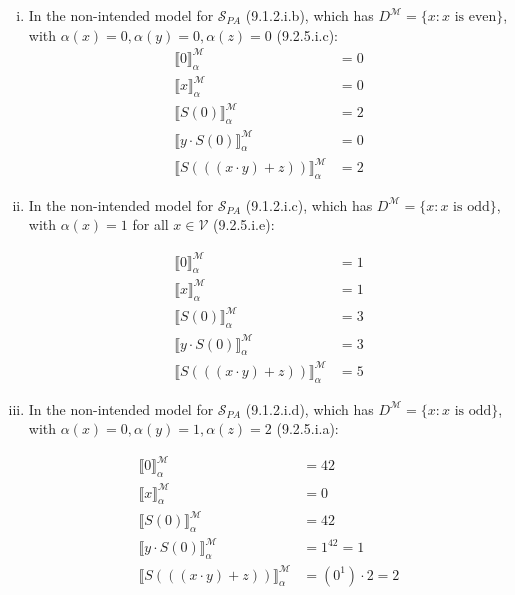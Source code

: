 \begin{enumerate}[\thesection.1]
\begin{enumerate}[(i)]
			\item In the non-intended model for $\mathcal{S}_{PA}$ (9.1.2.i.b), which has $D^\mathcal{M}=\{x:x\text{ is even}\}$, with $\alpha(x)=0,\alpha(y)=0,\alpha(z)=0$ (9.2.5.i.c):
			\begin{align*}
			\llbracket 0\rrbracket^\mathcal{M}_\alpha&=0\\
			\llbracket x\rrbracket^\mathcal{M}_\alpha&=0\\
			\llbracket S(0)\rrbracket^\mathcal{M}_\alpha&=2\\
			\llbracket y\cdot S(0)\rrbracket^\mathcal{M}_\alpha&=0\\
			\llbracket S(((x\cdot y)+z))\rrbracket^\mathcal{M}_\alpha&=2
			\end{align*}
			
			\item In the non-intended model for $\mathcal{S}_{PA}$ (9.1.2.i.c), which has $D^\mathcal{M}=\{x:x\text{ is odd}\}$, with $\alpha(x)=1$ for all $x\in\mathcal{V}$ (9.2.5.i.e):
			
			\begin{align*}
			\llbracket 0\rrbracket^\mathcal{M}_\alpha&=1\\
			\llbracket x\rrbracket^\mathcal{M}_\alpha&=1\\
			\llbracket S(0)\rrbracket^\mathcal{M}_\alpha&=3\\
			\llbracket y\cdot S(0)\rrbracket^\mathcal{M}_\alpha&=3\\
			\llbracket S(((x\cdot y)+z))\rrbracket^\mathcal{M}_\alpha&=5
			\end{align*}
			
			\item In the non-intended model for $\mathcal{S}_{PA}$ (9.1.2.i.d), which has $D^\mathcal{M}=\{x:x\text{ is odd}\}$, with $\alpha(x)=0,\alpha(y)=1,\alpha(z)=2$ (9.2.5.i.a):
			
			\begin{align*}
			\llbracket 0\rrbracket^\mathcal{M}_\alpha&=42\\
			\llbracket x\rrbracket^\mathcal{M}_\alpha&=0\\
			\llbracket S(0)\rrbracket^\mathcal{M}_\alpha&=42\\
			\llbracket y\cdot S(0)\rrbracket^\mathcal{M}_\alpha&=1^{42}=1\\
			\llbracket S(((x\cdot y)+z))\rrbracket^\mathcal{M}_\alpha&=(0^1)\cdot 2=2
			\end{align*}
			

\end{enumerate}
\end{enumerate}
